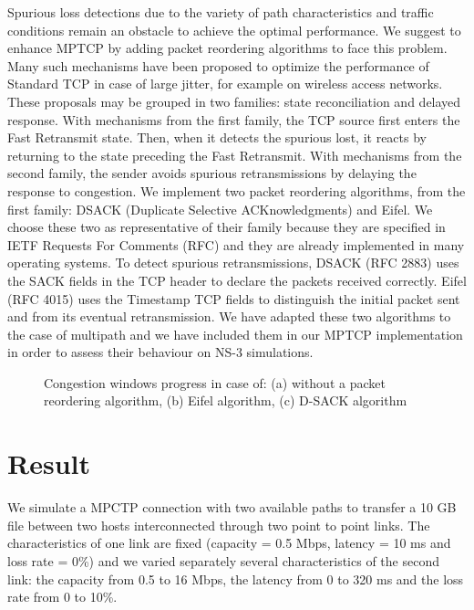 \documentclass[10pt,a4paper]{article}
\begin{document}
Spurious loss detections due to the variety of path characteristics and traffic conditions remain an obstacle to achieve the optimal performance. We suggest to enhance MPTCP by adding packet reordering algorithms to face this problem. Many such mechanisms have been proposed to optimize the performance of Standard TCP in case of large jitter, for example on wireless access networks. These proposals may be grouped in two families: state reconciliation and delayed response. With mechanisms from the first family, the TCP source first enters the Fast Retransmit state. Then, when it detects the spurious lost, it reacts by returning to the state preceding the Fast Retransmit. With mechanisms from the second family, the sender avoids spurious retransmissions by delaying the response to congestion. 
We implement two packet reordering algorithms, from the first family: DSACK (Duplicate Selective ACKnowledgments) and Eifel. We choose these two as representative of their family because they are specified in IETF Requests For Comments (RFC) and they are already implemented in many operating systems. To detect spurious retransmissions, DSACK (RFC 2883) uses the SACK fields in the TCP header to declare the packets received correctly. Eifel (RFC 4015) uses the Timestamp TCP fields to distinguish the initial packet sent and from its eventual retransmission. 
We have adapted these two algorithms to the case of multipath and we have included them in our MPTCP implementation in order to assess their behaviour on NS-3 simulations.

\begin{figure}[ht]
\begin{center}

\caption{Congestion windows progress in case of: (a) without a packet reordering algorithm, (b) Eifel algorithm, (c) D-SACK algorithm}
\label{cwnd}
\end{center}
\end{figure}


\section{Result}
We simulate a MPCTP connection with two available paths to transfer a 10 GB file between two hosts interconnected through two point to point links. The characteristics of one link are fixed (capacity = 0.5 Mbps, latency = 10 ms and loss rate = 0\%) and we varied separately several characteristics of the second link: the capacity from 0.5 to 16 Mbps, the latency from 0 to 320 ms and the loss rate from 0 to 10\%. 
\end{document}
